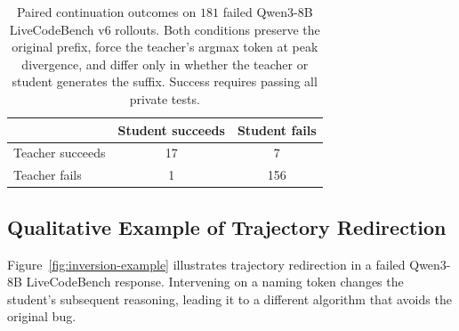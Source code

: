 \begin{table}[ht]
  \centering
\caption{Paired continuation outcomes on $181$ failed Qwen3-8B LiveCodeBench v6 rollouts. Both conditions preserve the original prefix, force the teacher's argmax token at peak divergence, and differ only in whether the teacher or student generates the suffix. Success requires passing all private tests.}  \label{tab:continuation-overlap}
  \small
  \begin{tabular}{lcc}
    \toprule
    & Student succeeds & Student fails \\
    \midrule
    Teacher succeeds & 17 & 7 \\
    Teacher fails & 1 & 156 \\
    \bottomrule
  \end{tabular}
\end{table}

\subsection{Qualitative Example of Trajectory Redirection}
\label{app:trajectory-redirection-example}

Figure~\ref{fig:inversion-example} illustrates trajectory redirection in a failed Qwen3-8B LiveCodeBench response. Intervening on a naming token changes the student's subsequent reasoning, leading it to a different algorithm that avoids the original bug.

